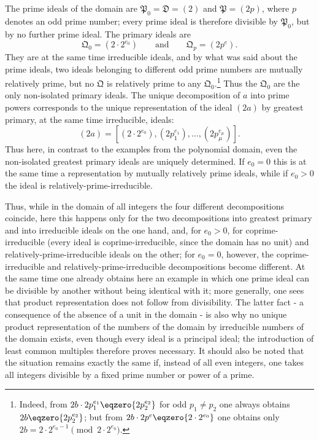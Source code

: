 \documentclass[11pt]{article}
\newcommand{\ideal}[1]{\mathfrak{#1}}
\begin{document}
The prime ideals of the domain are $\ideal P_0=\ideal D=(2)$ and $\ideal P=(2p)$, where $p$ denotes an odd prime number; every prime ideal is therefore divisible by $\ideal P_0$, but by no further prime ideal. The primary ideals are
\[
 \ideal Q_0=(2\cdot2^{e_0})
 \qquad\text{and}\qquad
 \ideal Q_p=(2p^e).
\]
They are at the same time irreducible ideals, and by what was said about the prime ideals, two ideals belonging to different odd prime numbers are mutually relatively prime, but no $\ideal Q$ is relatively prime to any $\ideal Q_0$.\footnote{Indeed, from $2b\cdot2p_1^{e_1}\eqzero{2p_2^{e_2}}$ for odd $p_1\ne p_2$ one always obtains $2b\eqzero{2p_2^{e_2}}$; but from $2b\cdot2p^e\eqzero{2\cdot2^{e_0}}$ one obtains only $2b=2\cdot2^{e_0-1}\pmod{2\cdot2^{e_0}}$.} Thus the $\ideal Q_0$ are the only non-isolated primary ideals. The unique decomposition of $a$ into prime powers corresponds to the unique representation of the ideal $(2a)$ by greatest primary, at the same time irreducible, ideals:
\[
 (2a)=[(2\cdot2^{e_0}),(2p_1^{e_1}),
\ldots,(2p_\mu^{e_\mu})].
\]
Thus here, in contrast to the examples from the polynomial domain, even the non-isolated greatest primary ideals are uniquely determined. If $e_0=0$ this is at the same time a representation by mutually relatively prime ideals, while if $e_0>0$ the ideal is relatively-prime-irreducible.

Thus, while in the domain of all integers the four different decompositions coincide, here this happens only for the two decompositions into greatest primary and into irreducible ideals on the one hand, and, for $e_0>0$, for coprime-irreducible (every ideal is coprime-irreducible, since the domain has no unit) and relatively-prime-irreducible ideals on the other; for $e_0=0$, however, the coprime-irreducible and relatively-prime-irreducible decompositions become different. At the same time one already obtains here an example in which one prime ideal can be divisible by another without being identical with it; more generally, one sees that product representation does not follow from divisibility. The latter fact - a consequence of the absence of a unit in the domain - is also why no unique product representation of the numbers of the domain by irreducible numbers of the domain exists, even though every ideal is a principal ideal; the introduction of least common multiples therefore proves necessary. It should also be noted that the situation remains exactly the same if, instead of all even integers, one takes all integers divisible by a fixed prime number or power of a prime.
\end{document}
